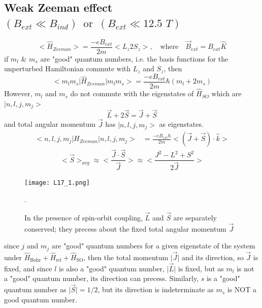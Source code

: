 \documentclass[12pt,fancychapters]{report}
\numberwithin{equation}{section}
\begin{document}
\subsection{Weak Zeeman effect $(B_{ext}\ll B_{ind})\,\,\,\text{or}\,\,\,(B_{ext}\ll 12.5\,\,T)$}
\[
  \big<\hat{H}_{Zeeman}\big> = \frac{-eB_{ext}}{2m}\big<L_z 2S_z \big>,\quad \text{where}\quad
  \vec{B}_{ext} = B_{ext}\hat{K}
\]
if $m_l$ \& $m_s$ are "good" quantum numbers, i.e. the basis functions for the unperturbed 
Hamiltonian commute with $L_z$ and $S_z$, then
\[
  \big<m_l m_s\big|\hat{H}_{Zeeman}\big|m_lm_s\big> = \frac{-eB_{ext}}{2m} \hbar\left(
  m_l + 2m_s\right)
\]
However, $m_l$ and $m_s$ do not commute with the eigenstates of $\hat{H}_{SO}$ which are 
$\big|n, l, j, m_j\big>$
\[
  \vec{L}+2\vec{S} = \vec{J}+\vec{S}
\]
and total angular momentum $\vec{J}$ has $\big|n, l, j, m_j\big>$ as eigenstates.
\begin{align*}
  \big<n,l, j, m_j\big|H_{Zeeman}\big|n,l,j,m_j\big> &= \frac{-eB_{ext}\hbar}{2m}
  \big<(\vec{J}+\vec{S})\cdot\hat{k} \big>
\end{align*}
\[
  \big<\vec{S}\big>_{avg} \approx \bigg<\frac{\vec{J}\cdot\vec{S}}{\vec{J}} \bigg>
  \approx \bigg<\frac{J^2 - L^2 + S^2}{2\vec{J}}\bigg>
\]
\begin{figure}[H]
  \centering
  \texttt{[image: L17\_1.png]}
  \caption{In the presence of spin-orbit coupling, $\vec{L}$ and $\vec{S}$ are separately 
  conserved; they precess about the fixed total angular momentum $\vec{J}$}.
\end{figure}
since $j$ and $m_j$ are "good" quantum numbers for a given eigenstate of 
the system under $\hat{H}_\text{Bohr} + \hat{H}_\text{rel} + \hat{H}_\text{SO}$, then the total 
momentum $\big|\vec{J}\big|$ and its direction, so $\vec{J}$ is fixed, and since $l$ is also 
a "good" quantum number, $\big|\vec{L}\big|$ is fixed, but as $m_l$ is not a "good" quantum number,
its direction can precess. Similarly, $s$ is a "good" quantum number as $\big|\vec{S}\big| = 1/2$,
but its direction is indeterminate as $m_s$ is NOT a good quantum number.\\
\end{document}
